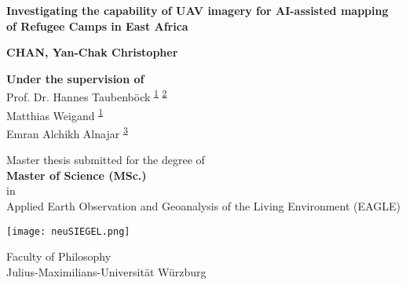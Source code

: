 \documentclass[11pt, a4paper, twoside]{report}
\begin{document}
\begin{titlepage}
   \begin{center}
       \vspace{0.25cm}

       \large
       \textbf{Investigating the capability of UAV imagery for AI-assisted mapping of Refugee Camps in East Africa}

       \vspace{0.75cm}

       \normalsize
       \textbf{CHAN, Yan-Chak Christopher}

       \vspace{2cm}

       \textbf{Under the supervision of} \\
       Prof. Dr. Hannes Taubenböck \textsuperscript{\hyperlink{DLR}{1}} \textsuperscript{\hyperlink{JMWU}{2}} \\
       Matthias Weigand \textsuperscript{\hyperlink{DLR}{1}} \\
       Emran Alchikh Alnajar \textsuperscript{\hyperlink{HOT}{3}}

       \vspace{1cm}

       Master thesis submitted for the degree of\\
       \textbf{Master of Science (MSc.)}\\
       \vspace{0.25cm}
       in\\
       \vspace{0.25cm}
       Applied Earth Observation and Geoanalysis of the Living Environment (EAGLE)

       \vspace{0.5cm}

       \texttt{[image: neuSIEGEL.png]}

       \vspace{0.5cm}

       \normalsize
       Faculty of Philosophy\\
       Julius-Maximilians-Universität Würzburg\\


   \end{center}
\end{titlepage}
\end{document}
